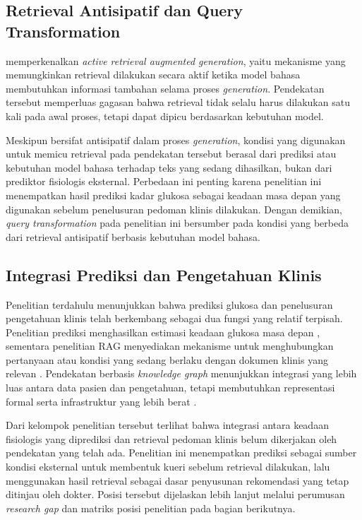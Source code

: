 \subsection{Retrieval Antisipatif dan Query Transformation}
\label{subsec:bab2-penelitian-retrieval-antisipatif}

\textcite{jiang2023} memperkenalkan \textit{active retrieval augmented generation}, yaitu mekanisme yang memungkinkan retrieval dilakukan secara aktif ketika model bahasa membutuhkan
informasi tambahan selama proses \textit{generation}. Pendekatan tersebut memperluas gagasan bahwa retrieval tidak selalu harus dilakukan satu kali pada awal proses, tetapi dapat
dipicu berdasarkan kebutuhan model.

Meskipun bersifat antisipatif dalam proses \textit{generation}, kondisi yang digunakan untuk memicu retrieval pada pendekatan tersebut berasal dari prediksi atau kebutuhan model
bahasa terhadap teks yang sedang dihasilkan, bukan dari prediktor fisiologis eksternal. Perbedaan ini penting karena penelitian ini menempatkan hasil prediksi kadar glukosa
sebagai keadaan masa depan yang digunakan sebelum penelusuran pedoman klinis dilakukan. Dengan demikian, \textit{query transformation} pada penelitian ini bersumber pada kondisi yang berbeda dari retrieval antisipatif berbasis kebutuhan model bahasa.

\subsection{Integrasi Prediksi dan Pengetahuan Klinis}
\label{subsec:bab2-integrasi-prediksi-pengetahuan}

Penelitian terdahulu menunjukkan bahwa prediksi glukosa dan penelusuran pengetahuan klinis telah berkembang sebagai dua fungsi yang relatif terpisah. Penelitian prediksi
menghasilkan estimasi keadaan glukosa masa depan \parencite{woldaregay2019,ghimire2024}, sementara penelitian RAG menyediakan mekanisme untuk menghubungkan pertanyaan atau
kondisi yang sedang berlaku dengan dokumen klinis yang relevan \parencite{kresevic2024,lee2024,wang2024}. Pendekatan berbasis \textit{knowledge graph} menunjukkan integrasi
yang lebih luas antara data pasien dan pengetahuan, tetapi membutuhkan representasi formal serta infrastruktur yang lebih berat \parencite{rad2024}.

Dari kelompok penelitian tersebut terlihat bahwa integrasi antara keadaan fisiologis yang diprediksi dan retrieval pedoman klinis belum dikerjakan oleh pendekatan yang
telah ada. Penelitian ini menempatkan prediksi sebagai sumber kondisi eksternal untuk membentuk kueri sebelum retrieval dilakukan, lalu
menggunakan hasil retrieval sebagai dasar penyusunan rekomendasi yang tetap ditinjau oleh dokter. Posisi tersebut dijelaskan lebih lanjut melalui perumusan \textit{research
gap} dan matriks posisi penelitian pada bagian berikutnya.

